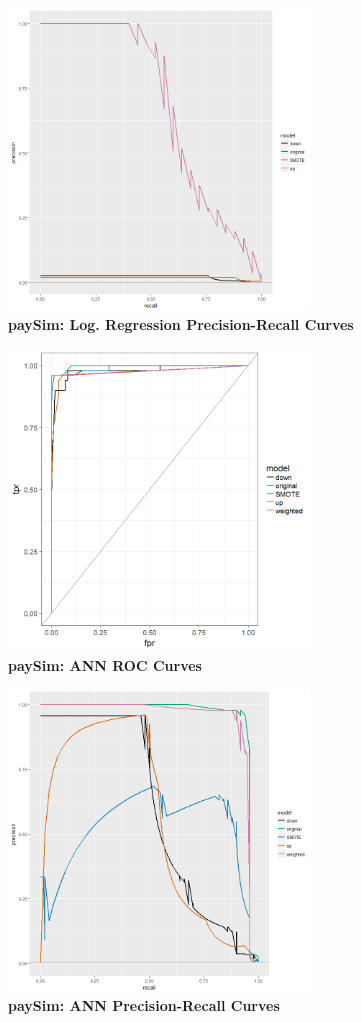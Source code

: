 \documentclass[12pt,]{article}
\begin{document}
\includegraphics[width=0.6\textwidth,height=\textheight]{figures/paysim/paySim_glm_PR.png}\\
\textbf{paySim: Log. Regression Precision-Recall Curves}

\includegraphics[width=0.6\textwidth,height=\textheight]{figures/paysim/paySim_nnet_rocs.png}\\
\textbf{paySim: ANN ROC Curves}

\includegraphics[width=0.6\textwidth,height=\textheight]{figures/paysim/paySim_nnet_PR.png}\\
\textbf{paySim: ANN Precision-Recall Curves}
\end{document}
